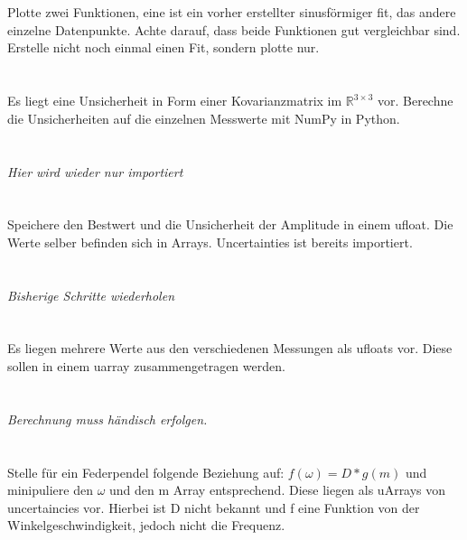 \documentclass[a4paper,12pt]{article}
\begin{document}
\section{}
Plotte zwei Funktionen, eine ist ein vorher erstellter sinusförmiger fit, das andere einzelne Datenpunkte. Achte darauf, dass beide Funktionen gut vergleichbar sind. Erstelle nicht noch einmal einen Fit, sondern plotte nur.

\section{}
Es liegt eine Unsicherheit in Form einer Kovarianzmatrix im $\mathbb{R}^{3 \times 3}$ vor. Berechne die Unsicherheiten auf die einzelnen Messwerte mit NumPy in Python.

\section{}
\textit{Hier wird wieder nur importiert}

\section{}
Speichere den Bestwert und die Unsicherheit der Amplitude  in einem ufloat.
Die Werte selber befinden sich in Arrays.  
Uncertainties ist bereits importiert.

\section{}
\textit{Bisherige Schritte wiederholen}

\section{}
Es liegen mehrere Werte aus den verschiedenen Messungen als ufloats vor. Diese sollen in einem uarray zusammengetragen werden.

\section{}
\textit{Berechnung muss händisch erfolgen.}

\section{}
Stelle für ein Federpendel folgende Beziehung auf: $f(\omega)= D * g(m)$
und minipuliere den $\omega$ und den m Array entsprechend. Diese liegen als uArrays von uncertaincies vor. Hierbei ist D nicht bekannt und f eine Funktion von der Winkelgeschwindigkeit, jedoch nicht die Frequenz.
\end{document}
